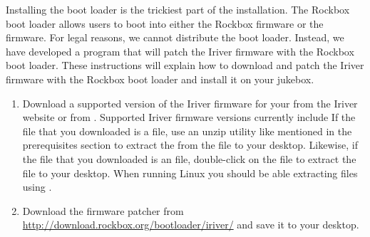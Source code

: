 
  Installing the boot loader is the trickiest part of the installation.
  The Rockbox boot loader allows users to boot into either the Rockbox 
  firmware or the \playerman{} firmware. For legal reasons, we cannot distribute 
  the boot loader. Instead, we have developed a program that will patch the 
  Iriver firmware with the Rockbox boot loader. These instructions will explain 
  how to download and patch the Iriver firmware with the Rockbox boot loader 
  and install it on your jukebox.


\begin{enumerate}
  \item Download a supported version of the Iriver firmware for your 
  \playername{} from the Iriver website or from 
  .
  Supported Iriver firmware versions currently include 
  If the file that you downloaded is a  file, use an unzip 
  utility like mentioned in the prerequisites section to extract
  the  from the  file
  to your desktop. Likewise, if the file that you downloaded is an 
   file, double-click on the  file to extract 
  the  file to your desktop.
  When running Linux you should be able extracting 
  files using .
  \item Download the firmware patcher  from 
  \url{http://download.rockbox.org/bootloader/iriver/} and save it to your desktop.
\end{enumerate}
